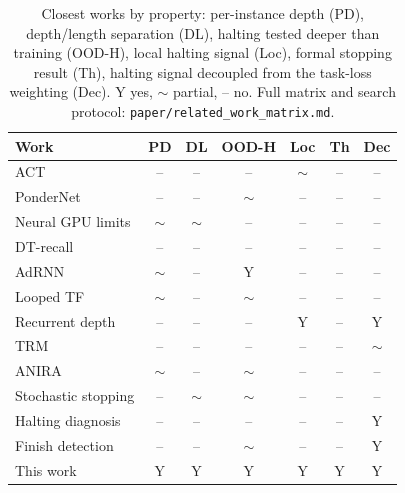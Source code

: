 \begin{table}[h]
  \centering
  \caption{Closest works by property: per-instance depth (PD), depth/length separation (DL), halting
  tested deeper than training (OOD-H), local halting signal (Loc), formal stopping result (Th), halting
  signal decoupled from the task-loss weighting (Dec). \textsf{Y} yes, $\sim$ partial, -- no.
  Full matrix and search protocol: \texttt{paper/related\_work\_matrix.md}.}
  \label{tab:related}
  \small
  \begin{tabular}{lcccccc}
    \toprule
    Work & PD & DL & OOD-H & Loc & Th & Dec \\
    \midrule
    ACT \citep{graves2016act} & -- & -- & -- & $\sim$ & -- & -- \\
    PonderNet \citep{banino2021pondernet} & -- & -- & $\sim$ & -- & -- & -- \\
    Neural GPU limits \citep{price2016extensions} & $\sim$ & $\sim$ & -- & -- & -- & -- \\
    DT-recall \citep{bansal2022endtoend} & -- & -- & -- & -- & -- & -- \\
    AdRNN \citep{veerabadran2023adaptive} & $\sim$ & -- & \textsf{Y} & -- & -- & -- \\
    Looped TF \citep{fan2025looped} & $\sim$ & -- & $\sim$ & -- & -- & -- \\
    Recurrent depth \citep{geiping2025scaling} & -- & -- & -- & \textsf{Y} & -- & \textsf{Y} \\
    TRM \citep{jolicoeur2025trm} & -- & -- & -- & -- & -- & $\sim$ \\
    ANIRA \citep{moosa2026anira} & $\sim$ & -- & $\sim$ & -- & -- & -- \\
    Stochastic stopping \citep{kuo2026stochastic} & -- & $\sim$ & $\sim$ & -- & -- & -- \\
    Halting diagnosis \citep{popescu2026halting} & -- & -- & -- & -- & -- & \textsf{Y} \\
    Finish detection \citep{krishna2026finish} & -- & -- & $\sim$ & -- & -- & \textsf{Y} \\
    \midrule
    This work & \textsf{Y} & \textsf{Y} & \textsf{Y} & \textsf{Y} & \textsf{Y} & \textsf{Y} \\
    \bottomrule
  \end{tabular}
\end{table}
